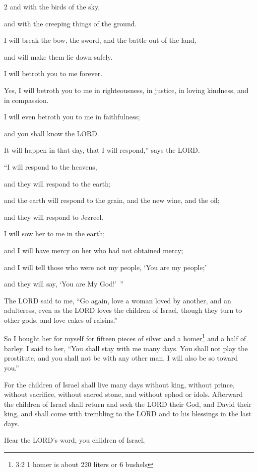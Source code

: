 \begin{multicols}{2}
and with the birds of the sky,

and with the creeping things of the ground.

I will break the bow, the sword, and the battle out of the land,

and will make them lie down safely.

\myverse{}I will betroth you to me forever.

Yes, I will betroth you to me in righteousness, in justice, in loving kindness,
and in compassion.

\myverse{}I will even betroth you to me in faithfulness;

and you shall know the LORD.

\myverse{}It will happen in that day, that I will respond,” says the LORD.

“I will respond to the heavens,

and they will respond to the earth;

\myverse{}and the earth will respond to the grain, and the new
wine, and the oil;

and they will respond to Jezreel.

\myverse{}I will sow her to me in the earth;

and I will have mercy on her who had not obtained mercy;

and I will tell those who were not my people, ‘You are my people;’

and they will say, ‘You are My God!’ ”


\mychapter{} \myverse*{}The LORD said to me, “Go again, love a woman loved by another,
and an adulteress, even as the LORD loves the children of Israel, though they turn to other gods, and
love cakes of raisins.”

\myverse{}So I bought her for myself for fifteen pieces of silver and a homer\footnote{3:2 1 homer is about 220 liters or 6 bushels} and a half of barley.
\myverse{}I said to her, “You shall stay with me many days. You shall not play the prostitute,
and you shall not be with any other man. I will also be so toward you.”

\myverse{}For the children of Israel shall live many days without king, without
prince, without sacrifice, without sacred stone, and without ephod or idols.
\myverse{}Afterward the children of Israel shall return and seek the LORD their God, and
David their king, and shall come with trembling to the LORD and to his blessings in the last days.


\mychapter{} \myverse*{}Hear the LORD’s word, you children of Israel,


\end{multicols}
